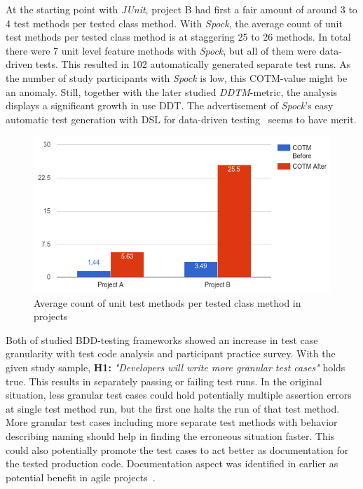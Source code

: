 At the starting point with \textit{JUnit}, project B had first a fair amount of around 3 to 4
test methods per tested class method. With \textit{Spock}, the average count of unit test methods per tested
class method is at staggering 25 to 26 methods. In total there were 7 unit level feature methods with \textit{Spock}, but all of them were
data-driven tests. This resulted in 102 automatically generated separate test runs. As the number of study participants with \textit{Spock} is low, this COTM-value might
be an anomaly. Still, together with the later studied \textit{DDTM}-metric, the analysis displays
a significant growth in use DDT. The advertisement of \textit{Spock}'s easy automatic test generation with DSL for data-driven testing~\cite{kapelonis2016java}
seems to have merit.

\begin{figure}[H]
  \begin{center}
    \includegraphics[width=12.7cm]{images/COTM.png}
    \caption{Average count of unit test methods per tested class method in projects}
    \label{fig:cotm}
  \end{center}
\end{figure}

Both of studied BDD-testing frameworks showed an increase in test case granularity with test code analysis and participant practice
survey. With the given study sample, \textbf{H1:} \textit{"Developers will write more granular test cases"} holds true.
This results in separately passing or failing test runs. In the original situation, less granular test cases could hold potentially multiple
assertion errors at single test method run, but the first one halts the run of that test method. More granular test cases including more separate
test methods with behavior describing naming should help in finding the erroneous situation faster. This could also potentially
promote the test cases to act better as documentation for the tested production code. Documentation aspect was identified in earlier as potential benefit
in agile projects~\cite{runeson2006survey}.

